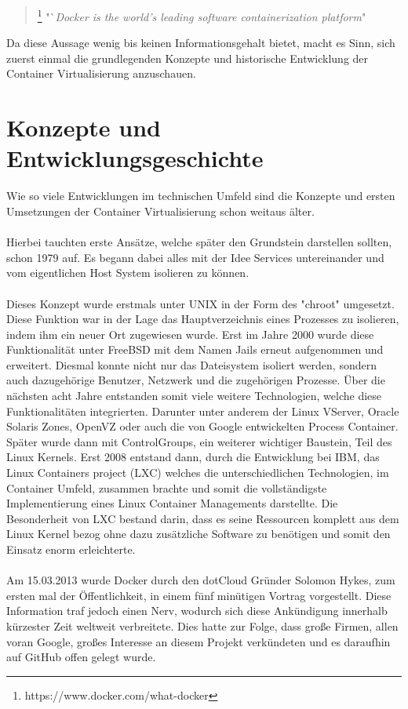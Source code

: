 \documentclass[12pt,toc=bib,toc=listof]{scrreprt}
\begin{document}
\begin{quote}
	\footnote[1]{https://www.docker.com/what-docker}
	"`\textit{Docker is the world's leading software containerization platform}"
\end{quote}
Da diese Aussage wenig bis keinen Informationsgehalt bietet, macht es Sinn, sich zuerst einmal die grundlegenden Konzepte und historische Entwicklung der Container Virtualisierung anzuschauen. 

\section{Konzepte und Entwicklungsgeschichte}

Wie so viele Entwicklungen im technischen Umfeld sind die Konzepte und ersten Umsetzungen der Container Virtualisierung schon weitaus älter.\\
\\
Hierbei tauchten erste Ansätze, welche später den Grundstein darstellen sollten, schon 1979 auf.
Es begann dabei alles mit der Idee Services untereinander und vom eigentlichen Host System isolieren zu können.\\
\\
Dieses Konzept wurde erstmals unter UNIX in der Form des "chroot" umgesetzt.
Diese Funktion war in der Lage das Hauptverzeichnis eines Prozesses zu isolieren, indem ihm ein neuer Ort zugewiesen wurde. 
Erst im Jahre 2000 wurde diese Funktionalität unter FreeBSD mit dem Namen Jails erneut aufgenommen und erweitert.
Diesmal konnte nicht nur das Dateisystem isoliert werden, sondern auch dazugehörige Benutzer, Netzwerk und die zugehörigen Prozesse.
Über die nächsten acht Jahre entstanden somit viele weitere Technologien, welche diese Funktionalitäten integrierten. Darunter unter anderem der
Linux VServer, Oracle Solaris Zones, OpenVZ oder auch die von Google entwickelten Process Container.
Später wurde dann mit ControlGroups, ein weiterer wichtiger Baustein, Teil des Linux Kernels. 
Erst 2008 entstand dann, durch die Entwicklung bei IBM, das Linux Containers project (LXC) welches die unterschiedlichen Technologien, im Container Umfeld, zusammen brachte und somit die vollständigste Implementierung eines Linux Container Managements darstellte.
Die Besonderheit von LXC bestand darin, dass es seine Ressourcen komplett aus dem Linux Kernel bezog ohne dazu zusätzliche Software zu benötigen und somit den Einsatz enorm erleichterte.\\
\\
Am 15.03.2013 wurde Docker durch den dotCloud Gründer Solomon Hykes, zum ersten mal der Öffentlichkeit, in einem fünf minütigen Vortrag vorgestellt.
Diese Information traf jedoch einen Nerv, wodurch sich diese Ankündigung innerhalb kürzester Zeit weltweit verbreitete.
Dies hatte zur Folge, dass große Firmen, allen voran Google, großes Interesse an diesem Projekt verkündeten und es daraufhin auf GitHub offen gelegt wurde.
\end{document}
